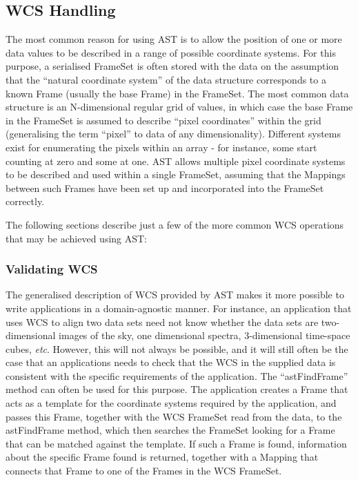 \documentclass[final,authoryear,5p,times,twocolumn]{elsarticle}
\begin{document}
\subsection{WCS Handling}
The most common reason for using AST is to allow the position of one or
more data values to be described in a range of possible coordinate
systems. For this purpose, a serialised FrameSet is often stored with the
data on the assumption that the ``natural coordinate system'' of the data
structure corresponds to a known Frame (usually the base Frame) in the
FrameSet. The most common data structure is an N-dimensional regular grid
of values, in which case the base Frame in the FrameSet is assumed to describe
``pixel coordinates'' within the grid (generalising the term ``pixel'' to
data of any dimensionality). Different systems exist for enumerating the
pixels within an array - for instance, some start counting at zero and
some at one. AST allows multiple pixel coordinate systems to be described
and used within a single FrameSet, assuming that the Mappings between
such Frames have been set up and incorporated into the FrameSet correctly.

The following sections describe just a few of the more common WCS
operations that may be achieved using AST:

\subsubsection{Validating WCS}
The generalised description of WCS provided by AST makes it more possible
to write applications in a domain-agnostic manner. For instance, an
application that uses WCS to align two data sets need not know whether the
data sets are two-dimensional images of the sky, one dimensional spectra,
3-dimensional time-space cubes, \emph{etc}. However, this will not always
be possible, and it will still often be the case that an applications needs
to check that the WCS in the supplied data is consistent with the
specific requirements of the application. The ``astFindFrame'' method can
often be used for this purpose. The application creates a Frame that acts
as a template for the coordinate systems required by the application,
and passes this Frame, together with the WCS FrameSet read from the data,
to the astFindFrame method, which then searches the FrameSet looking for
a Frame that can be matched against the template. If such a Frame is
found, information about the specific Frame found is returned, together
with a Mapping that connects that Frame to one of the Frames in the WCS
FrameSet.
\end{document}
